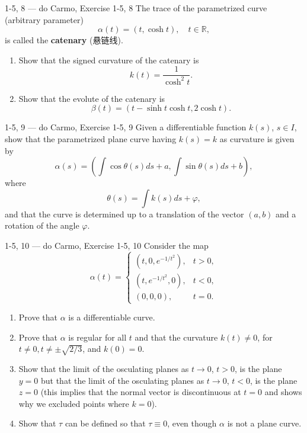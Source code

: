 \begin{exercise}{1-5, 8 — do Carmo, Exercise 1-5, 8}
The trace of the parametrized curve (arbitrary parameter)
\[
\alpha(t) = (t, \cosh t), \quad t \in \mathbb{R},
\]
is called the \textbf{catenary} (悬链线).
\begin{enumerate}
\item[a.] Show that the signed curvature of the catenary is
\[
k(t) = \frac{1}{\cosh^2 t}.
\]
\item[b.] Show that the evolute of the catenary is
\[
\beta(t) = (t - \sinh t \cosh t, 2\cosh t).
\]
\end{enumerate}
\end{exercise}

\begin{exercise}{1-5, 9 — do Carmo, Exercise 1-5, 9}
Given a differentiable function $k(s)$, $s \in I$, show that the parametrized plane curve having $k(s) = k$ as curvature is given by
\[
\alpha(s) = \left(\int \cos\theta(s) ds + a, \int \sin\theta(s) ds + b\right),
\]
where
\[
\theta(s) = \int k(s) ds + \varphi,
\]
and that the curve is determined up to a translation of the vector $(a, b)$ and a rotation of the angle $\varphi$.
\end{exercise}

\begin{exercise}{1-5, 10 — do Carmo, Exercise 1-5, 10}
Consider the map
\[
\alpha(t) = \begin{cases}
(t, 0, e^{-1/t^2}), & t > 0, \\
(t, e^{-1/t^2}, 0), & t < 0, \\
(0, 0, 0), & t = 0.
\end{cases}
\]
\begin{enumerate}
\item[a.] Prove that $\alpha$ is a differentiable curve.
\item[b.] Prove that $\alpha$ is regular for all $t$ and that the curvature $k(t) \neq 0$, for $t \neq 0, t \neq \pm\sqrt{2/3}$, and $k(0) = 0$.
\item[c.] Show that the limit of the osculating planes as $t \to 0$, $t > 0$, is the plane $y = 0$ but that the limit of the osculating planes as $t \to 0$, $t < 0$, is the plane $z = 0$ (this implies that the normal vector is discontinuous at $t = 0$ and shows why we excluded points where $k = 0$).
\item[d.] Show that $\tau$ can be defined so that $\tau \equiv 0$, even though $\alpha$ is not a plane curve.
\end{enumerate}
\end{exercise}

